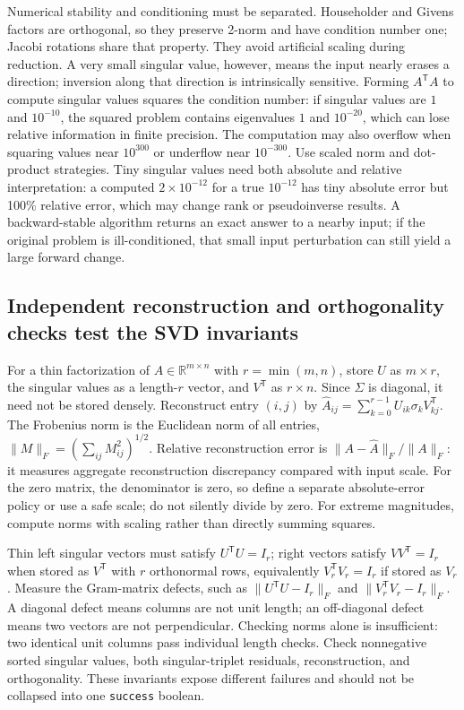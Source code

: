 Numerical stability and conditioning must be separated. Householder and Givens factors are orthogonal, so they preserve 2-norm and have condition number one; Jacobi rotations share that property. They avoid artificial scaling during reduction. A very small singular value, however, means the input nearly erases a direction; inversion along that direction is intrinsically sensitive. Forming \(A^\mathsf TA\) to compute singular values squares the condition number: if singular values are \(1\) and \(10^{-10}\), the squared problem contains eigenvalues \(1\) and \(10^{-20}\), which can lose relative information in finite precision. The computation may also overflow when squaring values near \(10^{300}\) or underflow near \(10^{-300}\). Use scaled norm and dot-product strategies. Tiny singular values need both absolute and relative interpretation: a computed \(2\times10^{-12}\) for a true \(10^{-12}\) has tiny absolute error but 100\% relative error, which may change rank or pseudoinverse results. A backward-stable algorithm returns an exact answer to a nearby input; if the original problem is ill-conditioned, that small input perturbation can still yield a large forward change.

\subsection{Independent reconstruction and orthogonality checks test the SVD invariants}\label{independent-reconstruction-and-orthogonality-checks-test-the-svd-invariants}

For a thin factorization of \(A\in\mathbb R^{m\times n}\) with \(r=\min(m,n)\), store \(U\) as \(m\times r\), the singular values as a length-\(r\) vector, and \(V^\mathsf T\) as \(r\times n\). Since \(\Sigma\) is diagonal, it need not be stored densely. Reconstruct entry \((i,j)\) by \(\hat A_{ij}=\sum_{k=0}^{r-1}U_{ik}\sigma_kV^\mathsf T_{kj}\). The Frobenius norm is the Euclidean norm of all entries, \(\|M\|_F=(\sum_{ij}M_{ij}^2)^{1/2}\). Relative reconstruction error is \(\|A-\hat A\|_F/\|A\|_F\): it measures aggregate reconstruction discrepancy compared with input scale. For the zero matrix, the denominator is zero, so define a separate absolute-error policy or use a safe scale; do not silently divide by zero. For extreme magnitudes, compute norms with scaling rather than directly summing squares.

Thin left singular vectors must satisfy \(U^\mathsf TU=I_r\); right vectors satisfy \(VV^\mathsf T=I_r\) when stored as \(V^\mathsf T\) with \(r\) orthonormal rows, equivalently \(V_r^\mathsf TV_r=I_r\) if stored as \(V_r\). Measure the Gram-matrix defects, such as \(\|U^\mathsf TU-I_r\|_F\) and \(\|V_r^\mathsf TV_r-I_r\|_F\). A diagonal defect means columns are not unit length; an off-diagonal defect means two vectors are not perpendicular. Checking norms alone is insufficient: two identical unit columns pass individual length checks. Check nonnegative sorted singular values, both singular-triplet residuals, reconstruction, and orthogonality. These invariants expose different failures and should not be collapsed into one \texttt{success} boolean.

